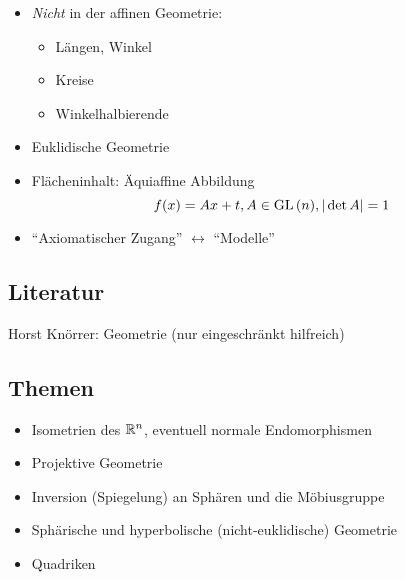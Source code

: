 \documentclass[
 a4paper,
 12pt,
 parskip=half
 ]{scrartcl}
\theoremstyle{plain}
\theoremstyle{definition}
\numberwithin{equation}{section}
\begin{document}
\begin{itemize}
 \item \emph{Nicht} in der affinen Geometrie: 
  \begin{itemize}
   \item Längen, Winkel
   \item Kreise
   \item Winkelhalbierende
  \end{itemize}
 \item Euklidische Geometrie
 \item Flächeninhalt: Äquiaffine Abbildung
  \[ f(x) = Ax + t, A \in \mathrm{GL}\,(n), |\det A| = 1 \]
 \item ``Axiomatischer Zugang'' $\longleftrightarrow$ ``Modelle''
\end{itemize}

\subsection{Literatur}
Horst Knörrer: Geometrie (nur eingeschränkt hilfreich)

\subsection{Themen}
\begin{itemize}
 \item Isometrien des $\mathbb{R}^n$, eventuell normale Endomorphismen
 \item Projektive Geometrie
 \item Inversion (Spiegelung) an Sphären und die Möbiusgruppe
 \item Sphärische und hyperbolische (nicht-euklidische) Geometrie
 \item Quadriken
\end{itemize}
\end{document}
